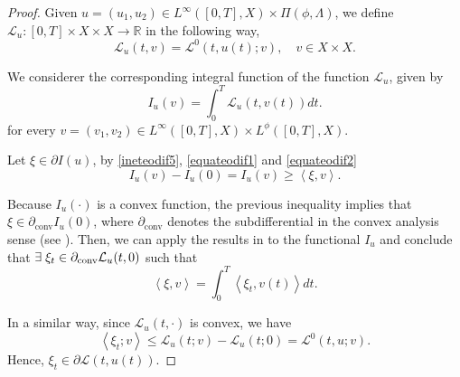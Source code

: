 \documentclass[twoside]{article}
\theoremstyle{definition}
\theoremstyle{plain}
\theoremstyle{remark}
\begin{document}
\begin{proof}
Given 
$u=(u_1,u_2) \in L^\infty([0,T],X)\times\Pi(\phi, \Lambda)$, we define $\mathcal{L}_u:[0,T]\times X\times X\rightarrow \mathbb{R}$ in the following way,
\begin{equation}\label{equateodif1}
 \mathcal{L}_u(t,v) = \mathcal{L}^0(t,u(t);v), \quad v\in X\times X.
\end{equation}


We considerer the corresponding integral function of the function $\mathcal{L}_u$, given by 
\begin{equation}\label{equateodif2}
I_u(v) = \int_0^T{ \mathcal{L}_u(t,v(t))dt}. 
\end{equation}
for every $ v=(v_1,v_2)\in L^\infty([0,T],X)\times L^\phi([0,T],X).$
 
Let $\xi \in \partial I(u)$, by \eqref{ineteodif5}, \eqref{equateodif1} and \eqref{equateodif2} 
\[I_u(v)-I_u(0) =I_u(v)\geq \left<\xi, v\right>.\]

Because $I_u(\cdot)$ is a convex function, the previous inequality implies that $\xi \in \partial_{\text{conv}} I_u(0)$, where $\partial_{\text{conv}}$ denotes the subdifferential in the convex analysis sense (see \cite{clarke2013functional}). Then, we can  apply the results in \cite{ioffe1972subdifferentials} to the functional $I_u$ and conclude that $\exists \hspace{0,1cm}\xi_t \in \partial_{\text{conv}} \mathcal{L}_u(t,0) $ such that
\[\left<\xi, v\right> = \int_0^T{ \left<\xi_t, v(t)\right> dt}.\]

In a similar way, since $\mathcal{L}_u(t,\cdot)$ is convex, we have
\[\left<\xi_t;v\right>\leq \mathcal{L}_u(t;v)-\mathcal{L}_u(t;0)=\mathcal{L}^0(t,u;v).\]
Hence, $\xi_t \in \partial \mathcal{L}(t,u(t))$.
\end{proof}
\end{document}
